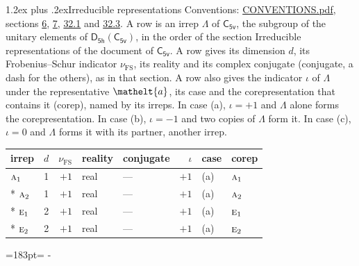 \documentclass[10pt,a4paper]{article}
\makeatletter
\renewcommand\section{\@startsection{section}{1}{\z@}{-3ex plus -1ex minus -.2ex}%
  {1.2ex plus .2ex}{\normalfont\large\sffamily\bfseries\color{parttitle}}}
\newcommand{\needspace}[1]{\par\penalty-100\begingroup\dimen0=#1\relax\dimen2=\pagegoal
  \advance\dimen2-\pagetotal\ifdim\dimen0>\dimen2\relax\ifdim\dimen2>0pt\vfil\break\fi\fi
  \endgroup}
\numberwithin{equation}{section}
\newcommand{\eltfont}[1]{{\let\sigma\eltsigma\mathelt{#1}}}
\newcommand{\grp}[1]{\mathsf{#1}}
\newcommand{\irr}[1]{\text{\normalfont\scshape #1}}
\newcommand{\elt}[1]{\eltfont{#1}}
\newcommand{\fsind}{\nu_{\mathrm{FS}}}
\makeatother
\begin{document}
\section{Irreducible representations}\label{s:irreps}
Conventions: \href{../../CONVENTIONS.pdf}{CONVENTIONS.pdf}, sections \href{../../../rotation/CONVENTIONS.pdf\#conv.6}{6}, \href{../../../rotation/CONVENTIONS.pdf\#conv.7}{7}, \href{../../CONVENTIONS.pdf\#conv.32.1}{32.1} and \href{../../CONVENTIONS.pdf\#conv.32.3}{32.3}.
\leavevmode\label{n:irrep.Delta}A row is an irrep $\Lambda$ of $\grp{C_{5v}}$, the subgroup of the unitary elements of $\grp{D_{5h}}(\grp{C_{5v}})$, in the order of the section Irreducible representations of the document of \href{../../../rotation/data/pdf/C5v.pdf}{$\grp{C_{5v}}$}. \label{n:index.dimension}\label{n:index.frobenius}\label{n:head.irrep}\label{n:head.reality}\label{n:head.conjugate}A row gives its dimension $d$, its Frobenius--Schur indicator $\fsind$, its reality and its complex conjugate (conjugate, a dash for the others), as in that section. \label{n:head.case.corep}\label{n:head.corep}A row also gives the indicator $\iota$ of $\Lambda$ under the representative $\elt{a}$, its case and the corepresentation that contains it (corep), named by its irreps. In case (a), $\iota = +1$ and $\Lambda$ alone forms the corepresentation. In case (b), $\iota = -1$ and two copies of $\Lambda$ form it. In case (c), $\iota = 0$ and $\Lambda$ forms it with its partner, another irrep.
\setlength{\emergencystretch}{2em}\par\setlength{\emergencystretch}{0pt}
{\small\renewcommand{\arraystretch}{1.25}\setlength{\tabcolsep}{4pt}\begin{longtable}{@{}lrrllrll@{}}\toprule
irrep & $d$ & $\fsind$ & reality & conjugate & $\iota$ & case & corep\\\midrule\endhead
\bottomrule\endfoot\endlastfoot
$\irr{a}_{1}$ & 1 & $+1$ & real & --- & $+1$ & (a) & $\irr{a}_{1}$\\*
$\irr{a}_{2}$ & 1 & $+1$ & real & --- & $+1$ & (a) & $\irr{a}_{2}$\\*
$\irr{e}_{1}$ & 2 & $+1$ & real & --- & $+1$ & (a) & $\irr{e}_{1}$\\*
$\irr{e}_{2}$ & 2 & $+1$ & real & --- & $+1$ & (a) & $\irr{e}_{2}$\\
\bottomrule\end{longtable}}
\needspace{183pt}
\end{document}

